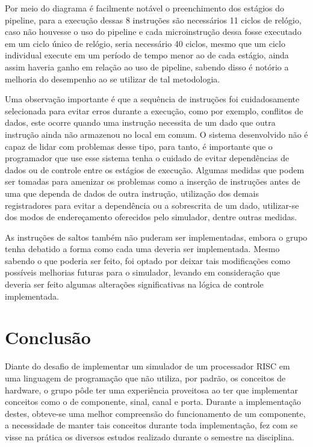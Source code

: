 \documentclass[12pt]{article}
\begin{document}
Por meio do diagrama é facilmente notável o preenchimento dos estágios do pipeline, para a execução dessas 8 instruções são necessários 11 ciclos de relógio, caso não houvesse o uso do pipeline e cada microinstrução dessa fosse executado em um ciclo único de relógio, seria necessário 40 ciclos, mesmo que um ciclo individual execute em um período de tempo menor ao de cada estágio, ainda assim haveria ganho em relação ao uso de pipeline, sabendo disso é notório a melhoria do desempenho ao se utilizar de tal metodologia.

Uma observação importante é que a sequência de instruções foi cuidadosamente selecionada para evitar erros durante a execução, como por exemplo, conflitos de dados, este ocorre quando uma instrução necessita de um dado que outra instrução ainda não armazenou no local em comum. O sistema desenvolvido não é capaz de lidar com problemas desse tipo, para tanto, é importante que o programador que use esse sistema tenha o cuidado de evitar dependências de dados ou de controle entre os estágios de execução. Algumas medidas que podem ser tomadas para amenizar os problemas como a inserção de instruções antes de uma que dependa de dados de outra instrução, utilização dos demais registradores para evitar a dependência ou a sobrescrita de um dado, utilizar-se dos modos de endereçamento oferecidos pelo simulador, dentre outras medidas.

As instruções de saltos também não puderam ser implementadas, embora o grupo tenha debatido a forma como cada uma deveria ser implementada. Mesmo sabendo o que poderia ser feito, foi optado por deixar tais modificações como possíveis melhorias futuras para o simulador, levando em consideração que deveria ser feito algumas alterações significativas na lógica de controle implementada.

\section{Conclusão}

Diante do desafio de implementar um simulador de um processador RISC em uma linguagem de programação que não utiliza, por padrão, os conceitos de hardware, o grupo pôde ter uma experiência proveitosa ao ter que implementar conceitos como o de componente, sinal, canal e porta. Durante a implementação destes, obteve-se uma melhor compreensão do funcionamento de um componente, a necessidade de manter tais conceitos durante toda implementação, fez com se visse na prática os diversos estudos realizado durante o semestre na disciplina.
\end{document}
